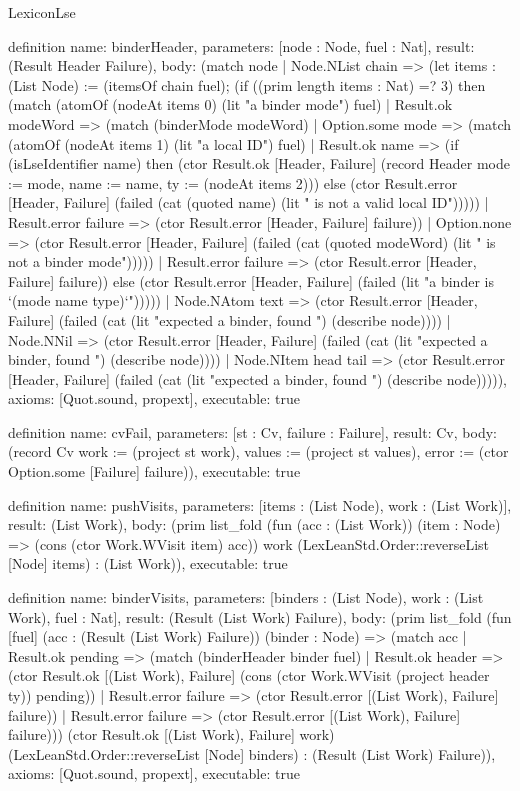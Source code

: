 \begin{lexlean}{LexiconLse}
\begin{semanticmodule}
definition{
  name: binderHeader,
  parameters: [node : Node, fuel : Nat],
  result: (Result Header Failure),
  body: (match node
    | Node.NList chain => (let items : (List Node) := (itemsOf chain fuel); (if ((prim length items : Nat) =? 3) then (match (atomOf (nodeAt items 0) (lit "a binder mode") fuel)
      | Result.ok modeWord => (match (binderMode modeWord)
        | Option.some mode => (match (atomOf (nodeAt items 1) (lit "a local ID") fuel)
          | Result.ok name => (if (isLseIdentifier name) then (ctor Result.ok [Header, Failure] (record Header {mode := mode, name := name, ty := (nodeAt items 2)})) else (ctor Result.error [Header, Failure] (failed (cat (quoted name) (lit " is not a valid local ID")))))
          | Result.error failure => (ctor Result.error [Header, Failure] failure))
        | Option.none => (ctor Result.error [Header, Failure] (failed (cat (quoted modeWord) (lit " is not a binder mode")))))
      | Result.error failure => (ctor Result.error [Header, Failure] failure)) else (ctor Result.error [Header, Failure] (failed (lit "a binder is `(mode name type)`")))))
    | Node.NAtom text => (ctor Result.error [Header, Failure] (failed (cat (lit "expected a binder, found ") (describe node))))
    | Node.NNil => (ctor Result.error [Header, Failure] (failed (cat (lit "expected a binder, found ") (describe node))))
    | Node.NItem head tail => (ctor Result.error [Header, Failure] (failed (cat (lit "expected a binder, found ") (describe node))))),
  axioms: [Quot.sound, propext],
  executable: true
}

definition{
  name: cvFail,
  parameters: [st : Cv, failure : Failure],
  result: Cv,
  body: (record Cv {work := (project st work), values := (project st values), error := (ctor Option.some [Failure] failure)}),
  executable: true
}

definition{
  name: pushVisits,
  parameters: [items : (List Node), work : (List Work)],
  result: (List Work),
  body: (prim list_fold (fun (acc : (List Work)) (item : Node) => (cons (ctor Work.WVisit item) acc)) work (LexLeanStd.Order::reverseList [Node] items) : (List Work)),
  executable: true
}

definition{
  name: binderVisits,
  parameters: [binders : (List Node), work : (List Work), fuel : Nat],
  result: (Result (List Work) Failure),
  body: (prim list_fold (fun [fuel] (acc : (Result (List Work) Failure)) (binder : Node) => (match acc
    | Result.ok pending => (match (binderHeader binder fuel)
      | Result.ok header => (ctor Result.ok [(List Work), Failure] (cons (ctor Work.WVisit (project header ty)) pending))
      | Result.error failure => (ctor Result.error [(List Work), Failure] failure))
    | Result.error failure => (ctor Result.error [(List Work), Failure] failure))) (ctor Result.ok [(List Work), Failure] work) (LexLeanStd.Order::reverseList [Node] binders) : (Result (List Work) Failure)),
  axioms: [Quot.sound, propext],
  executable: true
}


\end{semanticmodule}
\end{lexlean}
